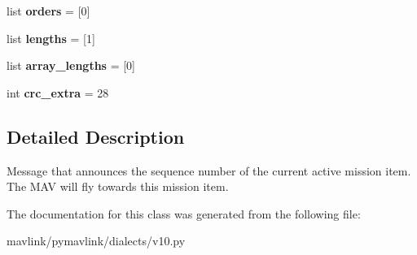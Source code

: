 \begin{DoxyCompactItemize}
\item 
\mbox{\label{classpymavlink_1_1dialects_1_1v10_1_1MAVLink__mission__current__message_aa3bb26110cd3ec38230ccfbc2a87dc7f}} 
list {\bfseries orders} = \mbox{[}0\mbox{]}
\item 
\mbox{\label{classpymavlink_1_1dialects_1_1v10_1_1MAVLink__mission__current__message_aae2a3b730882abc7b4800425c008dd0d}} 
list {\bfseries lengths} = \mbox{[}1\mbox{]}
\item 
\mbox{\label{classpymavlink_1_1dialects_1_1v10_1_1MAVLink__mission__current__message_a77e7b71699c1694ec92111894fc2b51f}} 
list {\bfseries array\+\_\+lengths} = \mbox{[}0\mbox{]}
\item 
\mbox{\label{classpymavlink_1_1dialects_1_1v10_1_1MAVLink__mission__current__message_af35e4a498c5daf2e52d83628005f5f18}} 
int {\bfseries crc\+\_\+extra} = 28
\end{DoxyCompactItemize}


\subsection{Detailed Description}
\begin{DoxyVerb}Message that announces the sequence number of the current
active mission item. The MAV will fly towards this mission
item.
\end{DoxyVerb}
 

The documentation for this class was generated from the following file\+:\begin{DoxyCompactItemize}
\item 
mavlink/pymavlink/dialects/v10.\+py\end{DoxyCompactItemize}
